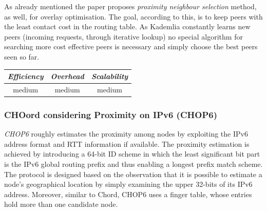 As already mentioned the paper proposes \emph{proximity neighbour selection}
method, as well, for overlay optimisation. The goal, according to this, is to
keep peers with the least contact cost in the routing table. As Kademlia
constantly learns new peers (incoming requests, through iterative lookup) no
special algorithm for searching more cost effective peers is necessary and
simply choose the best peers seen so far.

\begin{center}
\begin{tabular}{ccc}
\emph{Efficiency} & \emph{Overhead} & \emph{Scalability} \\
\hline
medium &
% 
medium &
%
medium
\end{tabular}
\end{center}

\subsubsection{CHOord considering Proximity on IPv6 (CHOP6)}
\emph{CHOP6} \cite{morimoto_chop6_2007} roughly estimates the proximity among
nodes by exploiting the IPv6 address format and RTT information if available.
The proximity estimation is achieved by introducing a 64-bit ID scheme in which
the least significant bit part is the IPv6 global routing prefix and thus
enabling a longest prefix match scheme. The protocol is designed based on the
observation that it is possible to estimate a node's geographical location by
simply examining the upper 32-bits of its IPv6 address. Moreover, similar to
Chord, CHOP6 uses a finger table, whose entries hold more than
one candidate node.

%
%

